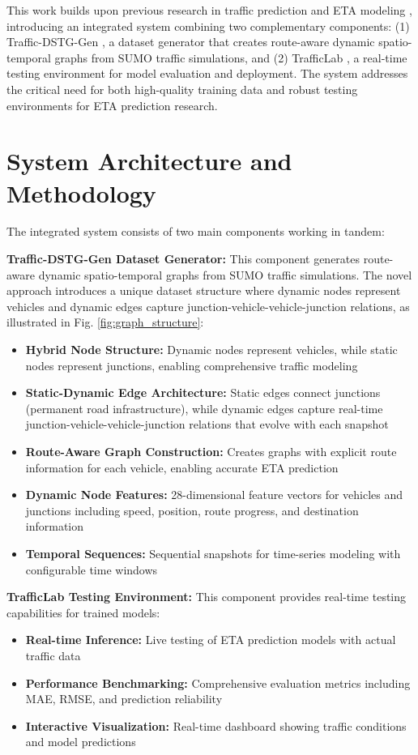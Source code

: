 \documentclass[conference]{IEEEtran}
\begin{document}
This work builds upon previous research in traffic prediction and ETA modeling \cite{b11,b12}, introducing an integrated system combining two complementary components: (1) Traffic-DSTG-Gen \cite{b3}, a dataset generator that creates route-aware dynamic spatio-temporal graphs from SUMO \cite{b4} traffic simulations, and (2) TrafficLab \cite{b5}, a real-time testing environment for model evaluation and deployment. The system addresses the critical need for both high-quality training data and robust testing environments for ETA prediction research.

\section{System Architecture and Methodology}

The integrated system consists of two main components working in tandem:

\textbf{Traffic-DSTG-Gen Dataset Generator:} This component generates route-aware dynamic spatio-temporal graphs from SUMO traffic simulations. The novel approach introduces a unique dataset structure where dynamic nodes represent vehicles and dynamic edges capture junction-vehicle-vehicle-junction relations, as illustrated in Fig. \ref{fig:graph_structure}:
\begin{itemize}
\item \textbf{Hybrid Node Structure:} Dynamic nodes represent vehicles, while static nodes represent junctions, enabling comprehensive traffic modeling
\item \textbf{Static-Dynamic Edge Architecture:} Static edges connect junctions (permanent road infrastructure), while dynamic edges capture real-time junction-vehicle-vehicle-junction relations that evolve with each snapshot
\item \textbf{Route-Aware Graph Construction:} Creates graphs with explicit route information for each vehicle, enabling accurate ETA prediction
\item \textbf{Dynamic Node Features:} 28-dimensional feature vectors for vehicles and junctions including speed, position, route progress, and destination information
\item \textbf{Temporal Sequences:} Sequential snapshots for time-series modeling with configurable time windows
\end{itemize}

\textbf{TrafficLab Testing Environment:} This component provides real-time testing capabilities for trained models:
\begin{itemize}
\item \textbf{Real-time Inference:} Live testing of ETA prediction models with actual traffic data
\item \textbf{Performance Benchmarking:} Comprehensive evaluation metrics including MAE, RMSE, and prediction reliability
\item \textbf{Interactive Visualization:} Real-time dashboard showing traffic conditions and model predictions
\end{itemize}
\end{document}
